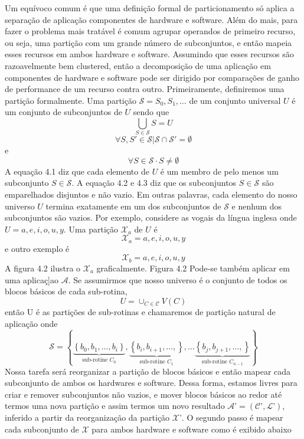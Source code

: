Um equívoco comum é que uma definição formal de particionamento só aplica a separação de aplicação componentes de hardware e software. Além do mais, para fazer o problema mais tratável é comum agrupar operandos de primeiro recurso, ou seja, uma partição com um grande número de subconjuntos, e então mapeia esses recursos em ambos hardware e software. Assumindo que esses recursos são razoavelmente bem clustered, então a decomposição de uma aplicação em componentes de hardware e software pode ser dirigido por comparações de ganho de performance de um recurso contra outro.
Primeiramente, definiremos uma partição formalmente. Uma partição $ \mathcal{S} = {S_0, S_1, \dots}$ de um conjunto universal $ U $ é um conjunto de subconjuntos de $ U $ sendo que 
$$ \bigcup_{S \in \mathcal{S}} S = U $$
$$ \forall S, S' \in \mathcal{S} | \mathcal{S} \cap \mathcal{S}' = \emptyset $$
e
$$ \forall S \in \mathcal{S} \cdot S \neq  \emptyset $$
A equação 4.1 diz que cada elemento de $ U $ é um membro de pelo menos um subconjunto $ S \in \mathcal{S} $. A equação 4.2 e 4.3 diz que os subconjuntos $ S \in \mathcal{S} $ são emparelhados disjuntos e não vazio. Em outras palavras, cada elemento do nosso universo $ U $ termina exatamente em um dos subconjuntos de $ \mathcal{S} $ e nenhum dos subconjuntos são vazios. Por exemplo, considere as vogais da língua inglesa onde $ U = {a, e, i, o, u, y} $. Uma partição $ \mathcal{X}_a $ de $ U $ é
$$ \mathcal{X}_a = {{a, e, i, o, u}, {y}} $$
e outro exemplo é 
$$ \mathcal{X}_b = {{a}, {e}, {i}, {o}, {u}, {y}} $$
A figura 4.2 ilustra o $ \mathcal{X}_a $ graficalmente.
Figura 4.2
Pode-se também aplicar em uma aplicaç]ao $ \mathcal{A} $. Se assumirmos que nosso universo é o conjunto de todos os blocos básicos de cada sub-rotina, 
$$ U = \cup_{C \in \mathcal{C}} V(C) $$
então U é as partições de sub-rotinas e chamaremos de partição natural de aplicação onde
$$
\mathcal{S}  = \left \{  
\underbrace{\left \{ b_0, b_1, \dots, b_i \right \}}_{\text{sub-rotine }C_0},
\underbrace{\left \{ b_i, b_{i+1}, \dots, \right \}}_{\text{sub-rotine }C_1},\dots
\underbrace{\left \{ b_j, b_{j+1}, \dots, \right \}}_{\text{sub-rotine }C_{n-1}}
\right \}
$$
Nossa tarefa será reorganizar a partição de blocos básicos e então mapear cada subconjunto de ambos os hardwares e software. Dessa forma, estamos livres para criar e remover subconjuntos não vazios, e mover blocos básicos ao redor até termos uma nova partição e assim termos um novo resultado $ \mathcal{A}’ = (\mathcal{C}’, \mathcal{L}’) $, inferido a partir da reorganização da partição $ \mathcal{X}’ $. O segundo passo é mapear cada subconjunto de $ \mathcal{X} $ para ambos hardware e software como é exibido abaixo

